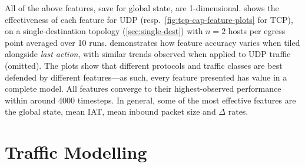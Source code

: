 \documentclass[10pt, times, comsoc]{IEEEtran}
\begin{document}
All of the above features, save for global state, are 1-dimensional.
 shows the effectiveness of each feature for UDP (resp.\ \cref{fig:tcp-cap-feature-plots} for TCP), on a single-destination topology (\cref{sec:single-dest}) with $n=2$ hosts per egress point averaged over 10 runs.
 demonstrates how feature accuracy varies when tiled alongside \emph{last action}, with similar trends observed when applied to UDP traffic (omitted).
The plots show that different protocols and traffic classes are best defended by different features---as such, every feature presented has value in a complete model.
All features converge to their highest-observed performance within around \num{4000} timesteps.
In general, some of the most effective features are the global state, mean IAT, mean inbound packet size and $\Delta$ rates.

\section{Traffic Modelling}\label{sec:a-new-normal}

%
\end{document}
